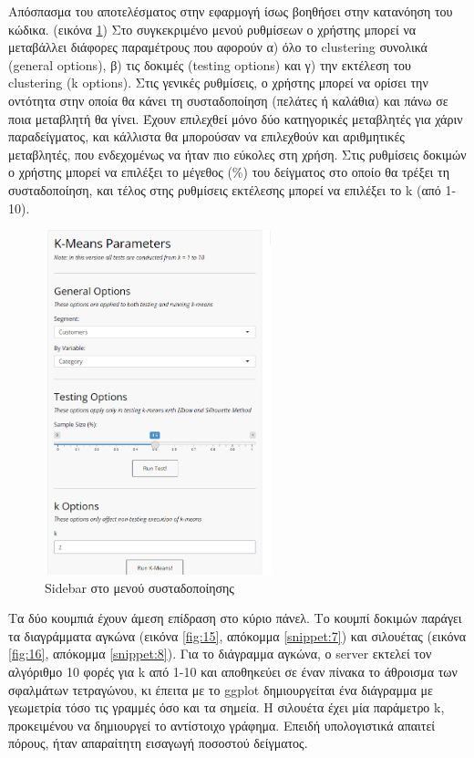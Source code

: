 \documentclass[greek, 12pt]{article}
\begin{document}
Απόσπασμα του αποτελέσματος στην εφαρμογή ίσως βοηθήσει στην κατανόηση του κώδικα. (εικόνα \ref{fig:14}) Στο συγκεκριμένο μενού ρυθμίσεων ο χρήστης μπορεί να μεταβάλλει διάφορες παραμέτρους που αφορούν α) όλο το clustering συνολικά (general options), β) τις δοκιμές (testing options) και γ) την εκτέλεση του clustering (k options). Στις γενικές ρυθμίσεις, ο χρήστης μπορεί να ορίσει την οντότητα στην οποία θα κάνει τη συσταδοποίηση (πελάτες ή καλάθια) και πάνω σε ποια μεταβλητή θα γίνει. Έχουν επιλεχθεί μόνο δύο κατηγορικές μεταβλητές για χάριν παραδείγματος, και κάλλιστα θα μπορούσαν να επιλεχθούν και αριθμητικές μεταβλητές, που ενδεχομένως να ήταν πιο εύκολες στη χρήση. Στις ρυθμίσεις δοκιμών ο χρήστης μπορεί να επιλέξει το μέγεθος (\%) του δείγματος στο οποίο θα τρέξει τη συσταδοποίηση, και τέλος στης ρυθμίσεις εκτέλεσης μπορεί να επιλέξει το k (από 1-10). 

\begin{figure}[h]
    \centering
    \includegraphics[height=10cm]{pictures/14_sidebar.png}
    \caption{Sidebar στο μενού συσταδοποίησης}
    \label{fig:14}
\end{figure}

Τα δύο κουμπιά έχουν άμεση επίδραση στο κύριο πάνελ. Το κουμπί δοκιμών παράγει τα διαγράμματα αγκώνα (εικόνα \ref{fig:15}, απόκομμα \ref{snippet:7}) και σιλουέτας (εικόνα \ref{fig:16}, απόκομμα \ref{snippet:8}). Για το διάγραμμα αγκώνα, ο server εκτελεί τον αλγόριθμο 10 φορές για k από 1-10 και αποθηκεύει σε έναν πίνακα το άθροισμα των σφαλμάτων τετραγώνου, κι έπειτα με το ggplot δημιουργείται ένα διάγραμμα με γεωμετρία τόσο τις γραμμές όσο και τα σημεία. Η σιλουέτα έχει μία παράμετρο k, προκειμένου να δημιουργεί το αντίστοιχο γράφημα. Επειδή υπολογιστικά απαιτεί πόρους, ήταν απαραίτητη εισαγωγή ποσοστού δείγματος.
\end{document}
